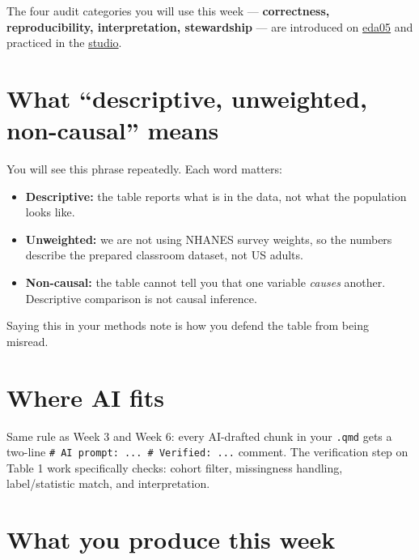 \documentclass[
  letterpaper,
  DIV=11,
  numbers=noendperiod,
  oneside]{scrreprt}
\providecommand{\tightlist}{%
  \setlength{\itemsep}{0pt}\setlength{\parskip}{0pt}}
\begin{document}
The four audit categories you will use this week ---
\textbf{correctness, reproducibility, interpretation, stewardship} ---
are introduced on \href{eda05-ai-audit-categories.qmd}{eda05} and
practiced in the \href{eda06-studio-planted-errors.qmd}{studio}.

\section*{What ``descriptive, unweighted, non-causal''
means}\label{what-descriptive-unweighted-non-causal-means}


You will see this phrase repeatedly. Each word matters:

\begin{itemize}
\tightlist
\item
  \textbf{Descriptive:} the table reports what is in the data, not what
  the population looks like.
\item
  \textbf{Unweighted:} we are not using NHANES survey weights, so the
  numbers describe the prepared classroom dataset, not US adults.
\item
  \textbf{Non-causal:} the table cannot tell you that one variable
  \emph{causes} another. Descriptive comparison is not causal inference.
\end{itemize}

Saying this in your methods note is how you defend the table from being
misread.

\section*{Where AI fits}\label{where-ai-fits-1}


Same rule as Week 3 and Week 6: every AI-drafted chunk in your
\texttt{.qmd} gets a two-line
\texttt{\#\ AI\ prompt:\ ...\ \#\ Verified:\ ...} comment. The
verification step on Table 1 work specifically checks: cohort filter,
missingness handling, label/statistic match, and interpretation.

\section*{What you produce this
week}\label{what-you-produce-this-week-1}
\end{document}
